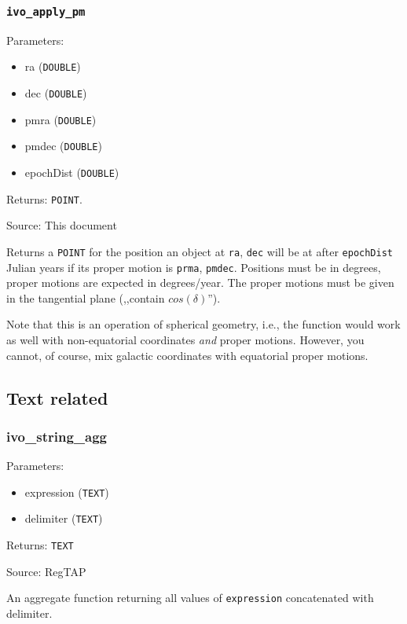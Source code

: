 \documentclass[11pt,a4paper]{ivoa}
\begin{document}
\subsubsection{\texttt{ivo\_apply\_pm}}

Parameters:

\begin{itemize}
	\item ra (\texttt{DOUBLE})
	\item dec (\texttt{DOUBLE})
	\item pmra (\texttt{DOUBLE})
	\item pmdec (\texttt{DOUBLE})
	\item epochDist (\texttt{DOUBLE})
\end{itemize}

Returns: \texttt{POINT}.

Source: This document

Returns a \texttt{POINT} for the position an object at \texttt{ra},
\texttt{dec} will be at after \texttt{epochDist} Julian years if its proper
motion is \texttt{prma}, \texttt{pmdec}.  Positions must be in degrees,
proper motions are expected in degrees/year. The proper motions must be
given in the tangential plane (,,contain $cos(\delta)$'').

Note that this is an operation of spherical geometry, i.e., the function
would work as well with non-equatorial coordinates \emph{and} proper
motions.  However, you cannot, of course, mix galactic coordinates with
equatorial proper motions.


\subsection{Text related}

\subsubsection{ivo\_string\_agg}

Parameters:

\begin{itemize}
	\item expression (\texttt{TEXT})
	\item delimiter (\texttt{TEXT})
\end{itemize}

Returns: \texttt{TEXT}

Source: RegTAP \citep{2014ivoa.spec.1208D}

An aggregate function returning all values of \texttt{expression} 
concatenated with delimiter.
\end{document}
